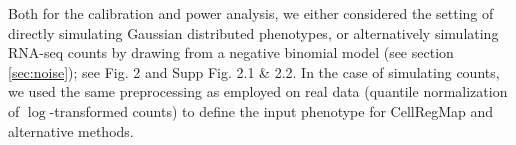Both for the calibration and power analysis, we either considered the setting of directly simulating Gaussian distributed phenotypes, or alternatively simulating RNA-seq counts by drawing from a negative binomial model (see section \ref{sec:noise}); see Fig. 2 and Supp Fig. 2.1 \& 2.2. In the case of simulating counts, we used the same preprocessing as employed on real data (quantile normalization of $\log$-transformed counts) to define the input phenotype for CellRegMap and alternative methods. 


